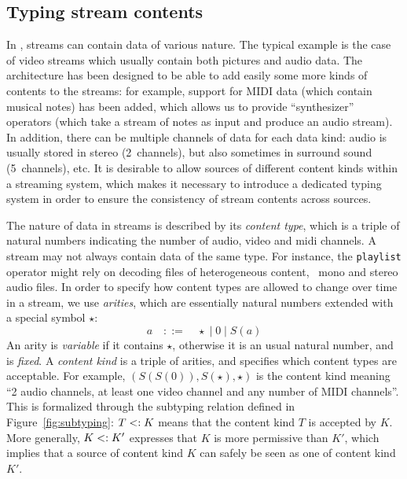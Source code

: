 
\subsection{Typing stream contents}


In \liquidsoap{}, streams can contain data of various nature. The typical
example is the case of video streams which usually contain both pictures and
audio data. The architecture has been designed to be able to add easily some
more kinds of contents to the streams: for example, support for MIDI data (which
contain musical notes) has been added, which allows us to provide
``synthesizer'' operators (which take a stream of notes as input and produce an
audio stream). In addition, there can be multiple channels of data for each data
kind: audio is usually stored in stereo (2~channels), but also sometimes in
surround sound (5~channels), etc. It is desirable to allow sources of different
content kinds within a streaming system, which makes it necessary to introduce a
dedicated typing system in order to ensure the consistency of stream contents
across sources.

The nature of data in streams is described by its \emph{content type}, which is
a triple of natural numbers indicating the number of audio, video and midi
channels.  A stream may not always contain data of the same type.  For instance,
the \texttt{playlist} operator might rely on decoding files of heterogeneous
content, \eg\ mono and stereo audio files.  In order to specify how content
types are allowed to change over time in a stream, we use \emph{arities}, which
are essentially natural numbers extended with a special symbol $\star$:
\[
a\quad ::=\quad \star \;|\; 0 \;|\; S(a)
\]
An arity is \emph{variable} if it contains $\star$, otherwise it is an usual
natural number, and is \emph{fixed}. A \emph{content kind} is a triple of
arities, and specifies which content types are acceptable. For example,
$(S(S(0)),S(\star),\star)$ is the content kind meaning ``2 audio channels, at
least one video channel and any number of MIDI channels''.
This is formalized through the subtyping relation defined in
Figure~\ref{fig:subtyping}: $T<: K$ means
that the content kind $T$ is accepted by $K$. More generally,
$K <: K'$ expresses that $K$ is more permissive than $K'$,
which implies that a source of content kind $K$ can safely be seen
as one of content kind $K'$.

